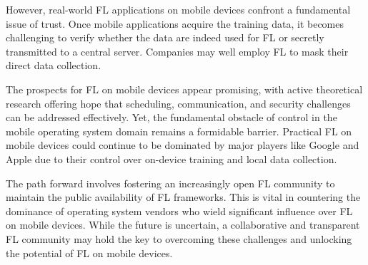 \documentclass[conference]{IEEEtran}
\begin{document}
However, real-world FL applications on mobile devices confront a fundamental
issue of trust.
Once mobile applications acquire the training data,
it becomes challenging to verify whether the data are indeed used for FL or
secretly transmitted to a central server.
Companies may well employ FL to mask their direct data collection.

The prospects for FL on mobile devices appear promising,
with active theoretical research offering hope that scheduling,
communication, and security challenges can be addressed effectively.
Yet, the fundamental obstacle of control in the mobile operating system domain
remains a formidable barrier.
Practical FL on mobile devices could continue to be dominated by
major players like Google and Apple due to
their control over on-device training and local data collection.

The path forward involves fostering an increasingly open FL community to
maintain the public availability of FL frameworks.
This is vital in countering the dominance of operating system vendors who
wield significant influence over FL on mobile devices.
While the future is uncertain,
a collaborative and transparent FL community may hold the key to
overcoming these challenges and unlocking the potential of FL on mobile devices.

\printbibliography
\end{document}

